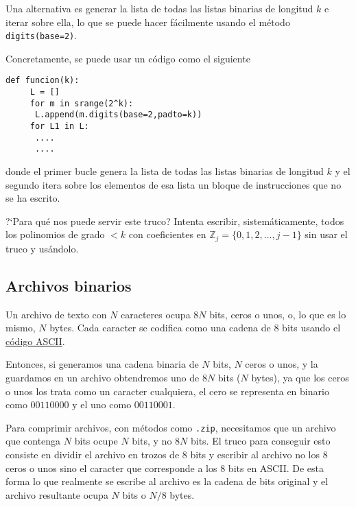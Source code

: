 Una alternativa es generar la  lista de todas las listas binarias de longitud
$k$ e iterar sobre ella, lo que se puede hacer f\'acilmente usando el m\'etodo
\lstinline|digits(base=2)|. 

Concretamente, se puede usar un c\'odigo como el siguiente

\begin{lstlisting}[columns=spaceflexible]
def funcion(k):
     L = []
     for m in srange(2^k):
	  L.append(m.digits(base=2,padto=k))
     for L1 in L:
	  ....
	  ....
\end{lstlisting}
donde el primer bucle genera la lista de todas las listas binarias de
longitud $k$ y el segundo itera sobre los elementos de esa lista un bloque de
instrucciones que no se ha escrito. 


?`Para qu\'e nos puede servir este truco? Intenta escribir, sistem\'aticamente, 
todos los polinomios de grado $<k$ con coeficientes en
$\mathbb{Z}_j=\{0,1,2,\dots,j-1\}$ sin usar el truco y us\'andolo.

\subsection{Archivos binarios}
Un archivo de texto con $N$ caracteres ocupa $8N$ bits, ceros o unos, o, lo que
es lo mismo, $N$ bytes. Cada caracter se codifica como una cadena de $8$ bits
usando el \href{http://en.wikipedia.org/wiki/ASCII}{c\'odigo ASCII}.

Entonces, si generamos una cadena binaria de $N$ bits, $N$ ceros o unos, y la
guardamos en un archivo obtendremos uno de $8N$ bits ($N$ bytes), ya que los
ceros o unos los trata como un caracter cualquiera, el cero se representa en
binario como $00110000$ y el uno como $00110001$.

Para comprimir archivos, con m\'etodos como {\tt .zip}, necesitamos que un
archivo que contenga $N$ bits ocupe $N$ bits, y no $8N$ bits. El truco para
conseguir esto consiste en dividir el archivo en trozos de $8$ bits y escribir
al archivo {\sc no los $8$ ceros o unos} sino el caracter que corresponde a los
$8$ bits en ASCII. De esta forma lo que realmente se escribe al archivo es la
cadena de bits original y el archivo resultante ocupa $N$ bits o $N/8$ bytes. 


